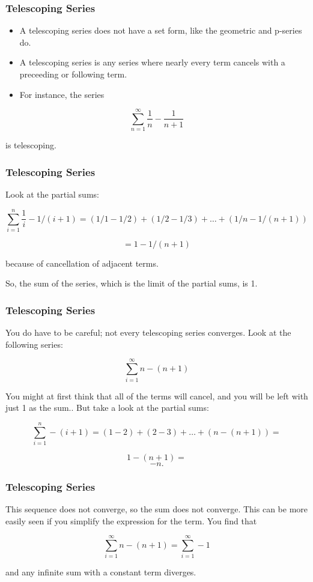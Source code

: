 \documentclass{beamer}
\begin{document}
\begin{frame}
	\frametitle{Telescoping Series}
	\Large
	
	\begin{itemize}
	\item A telescoping series does not have a set form, like the geometric and p-series do. \item A telescoping series is any series where nearly every term cancels with a preceeding or following term. \item For instance, the series
	\end{itemize}


\[   \sum^{\infty}_{n=1} \frac{1}{n} - \frac{1}{n+1} \]

is telescoping. 

\end{frame}
\begin{frame}
	\frametitle{Telescoping Series}
	\Large
	Look at the partial sums:


\[   \sum^{n}_{i=1}  \frac{1}{i}  - 1/(i+1) = (1/1 - 1/2) + (1/2 - 1/3) + \ldots + (1/n - 1/(n+1))\]

\[= 1 - 1/(n+1)\]

because of cancellation of adjacent terms. 

So, the sum of the series, which is the limit of the partial sums, is 1.
\end{frame}
\begin{frame}
\frametitle{Telescoping Series}
\Large
You do have to be careful; not every telescoping series converges. Look at the following series:

\[   \sum^{\infty}_{i=1} n - (n + 1) \]

You might at first think that all of the terms will cancel, and you will be left with just 1 as the sum.. But take a look at the partial sums:

\[   \sum^{n}_{i=1} - (i + 1) = (1 - 2) + (2 - 3) + \ldots + (n - (n + 1)) =\]

\[1 - (n + 1) =\]
\[-n.\]

\end{frame}
\begin{frame}
	\frametitle{Telescoping Series}
	\Large
This sequence does not converge, so the sum does not converge. This can be more easily seen if you simplify the expression for the term. You find that

\[   \sum^{\infty}_{i=1} n - (n + 1) = \sum^{\infty}_{i=1} -1 \]

and any infinite sum with a constant term diverges.
	\end{frame}
\end{document}
